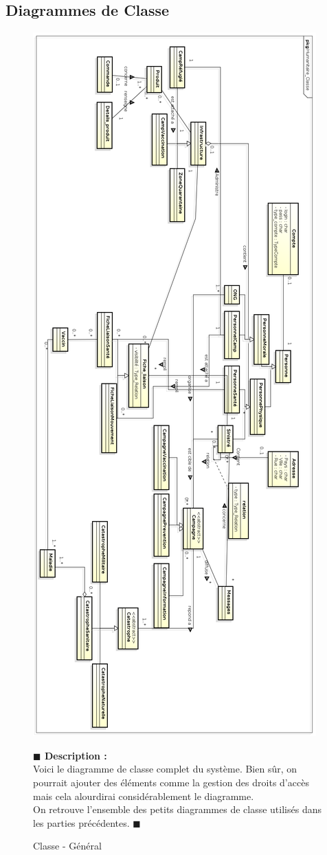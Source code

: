 \documentclass[11pt, titlepage]{report}
\newcommand{\debutDescription}{\noindent\textbf{\textcolor{DescriptionColor}{$\blacksquare$  Description : \\}}}
\newcommand{\finDescription}{\noindent\textcolor{DescriptionColor}{$\blacksquare$}}
\begin{document}
\subsection{Diagrammes de Classe}
\begin{figure}[h!]
\begin{center}
 \includegraphics[scale=.2]{../images/diagrammes/uml/complementaire/classe_general.png}  
\caption{Classe - Général}
\end{center}
\debutDescription
Voici le diagramme de classe complet du système. Bien sûr, on pourrait ajouter des éléments comme la gestion des droits d'accès mais cela alourdirai considérablement le diagramme.\\
On retrouve l'ensemble des petits diagrammes de classe utilisés dans les parties précédentes.
\finDescription
\end{figure}
\end{document}
